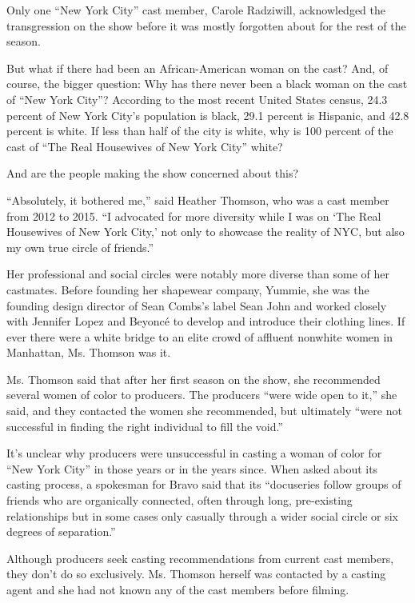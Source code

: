 Only one ``New York City'' cast member, Carole Radziwill, acknowledged
the transgression on the show before it was mostly forgotten about for
the rest of the season.

But what if there had been an African-American woman on the cast? And,
of course, the bigger question: Why has there never been a black woman
on the cast of ``New York City''? According to the most recent United
States census, 24.3 percent of New York City's population is black, 29.1
percent is Hispanic, and 42.8 percent is white. If less than half of the
city is white, why is 100 percent of the cast of ``The Real Housewives
of New York City'' white?

And are the people making the show concerned about this?

``Absolutely, it bothered me,'' said Heather Thomson, who was a cast
member from 2012 to 2015. ``I advocated for more diversity while I was
on `The Real Housewives of New York City,' not only to showcase the
reality of NYC, but also my own true circle of friends.''

Her professional and social circles were notably more diverse than some
of her castmates. Before founding her shapewear company, Yummie, she was
the founding design director of Sean Combs's label Sean John and worked
closely with Jennifer Lopez and Beyoncé to develop and introduce their
clothing lines. If ever there were a white bridge to an elite crowd of
affluent nonwhite women in Manhattan, Ms. Thomson was it.

Ms. Thomson said that after her first season on the show, she
recommended several women of color to producers. The producers ``were
wide open to it,'' she said, and they contacted the women she
recommended, but ultimately ``were not successful in finding the right
individual to fill the void.''

It's unclear why producers were unsuccessful in casting a woman of color
for ``New York City'' in those years or in the years since. When asked
about its casting process, a spokesman for Bravo said that its
``docuseries follow groups of friends who are organically connected,
often through long, pre-existing relationships but in some cases only
casually through a wider social circle or six degrees of separation.''

Although producers seek casting recommendations from current cast
members, they don't do so exclusively. Ms. Thomson herself was contacted
by a casting agent and she had not known any of the cast members before
filming.

